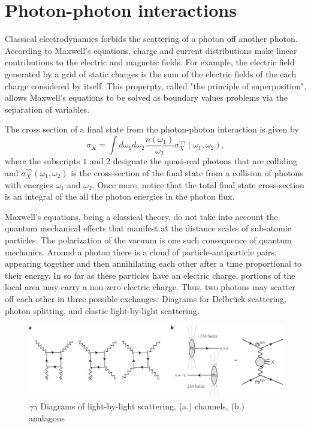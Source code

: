\section{Photon-photon interactions}

Classical electrodynamics forbids the scattering of a photon off another photon. According to Maxwell's equations, charge and current distributions make linear contributions to the electric and magnetic fields. For example, the electric field generated by a grid of static charges is the sum of the electric fields of the each charge considered by itself. This properpty, called "the principle of superposition", allows Maxwell's equations to be solved as boundary values problems via the separation of variables.

The cross section of a final state from the photon-photon interaction is given by
\begin{equation}
\sigma_X = \int d \omega_1 d \omega_2 \frac{n(\omega_1)}{\omega_2} \sigma_X^{\gamma\gamma}(\omega_1, \omega_2),
\end{equation}
where the subscripts $1$ and $2$ designate the quasi-real photons that are colliding and 
$\sigma_X^{\gamma\gamma}(\omega_1, \omega_2)$ is the cross-section of the final state from a collision of photons with energies $\omega_1$ and $\omega_2$. Once more, notice that the total final state cross-section is an integral of the all the photon energies in the photon flux. 

Maxwell's equations, being a classical theory, do not take into account the quantum mechanical effects that manifest at the distance scales of sub-atomic particles. The polarization of the vacuum is one such consequence of quantum mechanics. Around a photon there is a cloud of particle-antiparticle pairs, appearing together and then annihilating each other after a time proportional to their energy. In so far as these particles have an electric charge, portions of the local area may carry a non-zero electric charge. Thus, two photons may scatter off each other in three possible exchanges: Diagrams for Delbrück scattering, photon splitting, and elastic light-by-light scattering. 

\begin{figure}[]
\begin{centering}
\includegraphics[width=7in]{Chapter2/importfigs/nphys4208-f1.jpg}
\par\end{centering}
\caption{$\gamma \gamma$ Diagrams of light-by-light scattering, (a.) channels, (b.) analagous \cite{Aaboud:2017bwk} \label{fig:ggDiag}}
\end{figure}

